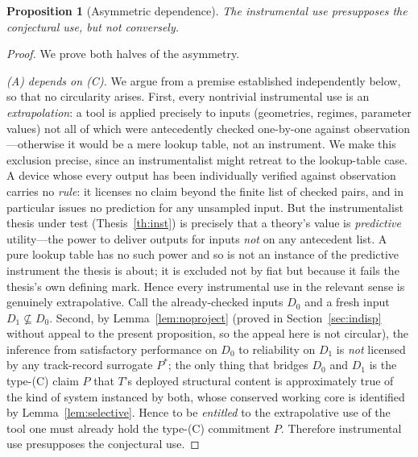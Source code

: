 \documentclass{amsart}
\theoremstyle{definition}
\theoremstyle{plain}
\newtheorem{proposition}{Proposition}
\begin{document}
\begin{proposition}[Asymmetric dependence]\label{prop:depend}
The instrumental use presupposes the conjectural use, but not conversely.
\end{proposition}

\begin{proof}
We prove both halves of the asymmetry.

\emph{(A) depends on (C).} We argue from a premise established independently
below, so that no circularity arises. First, every nontrivial instrumental use
is an \emph{extrapolation}: a tool is applied precisely to inputs (geometries,
regimes, parameter values) not all of which were antecedently checked
one-by-one against observation---otherwise it would be a mere lookup table, not
an instrument. We make this exclusion precise, since an instrumentalist might
retreat to the lookup-table case. A device whose every output has been
individually verified against observation carries no \emph{rule}: it licenses
no claim beyond the finite list of checked pairs, and in particular issues no
prediction for any unsampled input. But the instrumentalist thesis under test
(Thesis~\ref{th:inst}) is precisely that a theory's value is \emph{predictive}
utility---the power to deliver outputs for inputs \emph{not} on any antecedent
list. A pure lookup table has no such power and so is not an instance of the
predictive instrument the thesis is about; it is excluded not by fiat but
because it fails the thesis's own defining mark. Hence every instrumental use in
the relevant sense is genuinely extrapolative. Call the already-checked inputs $D_0$ and a fresh input
$D_1\not\subseteq D_0$. Second, by Lemma~\ref{lem:noproject} (proved in
Section~\ref{sec:indisp} without appeal to the present proposition, so the
appeal here is not circular), the inference from satisfactory performance on
$D_0$ to reliability on $D_1$ is \emph{not} licensed by any track-record
surrogate $P^{*}$; the only thing that bridges $D_0$ and $D_1$ is the type-(C)
claim $P$ that $T$'s deployed structural content is approximately true of the
kind of system instanced by both, whose conserved working core is identified by
Lemma~\ref{lem:selective}. Hence to be \emph{entitled} to the extrapolative
use of the tool one must already hold the type-(C) commitment $P$. Therefore
instrumental use presupposes the conjectural use.


\end{proof}
\end{document}

